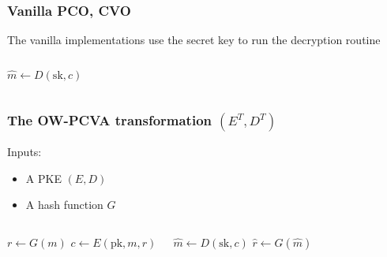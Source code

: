 \documentclass{beamer}
\begin{document}
\begin{frame}
    \frametitle{Vanilla PCO, CVO}

    The vanilla implementations use the secret key to run the decryption routine

    \begin{columns}
        \begin{algorithm}[H]
        \SetAlgoLined
        \caption{$\mathcal{O}^\text{CVO}$}
        $\hat{m} \leftarrow D(\text{sk}, c)$\;
        \;
        \end{algorithm}

        \begin{algorithm}[H]
        \SetAlgoLined
        \caption{$\mathcal{O}^\text{PCO}$}
        \;
    \end{algorithm}
    \end{columns}
\end{frame}

\begin{frame}
    \frametitle{The OW-PCVA transformation $(E^T, D^T)$}

    Inputs:
    \begin{itemize}
        \item A PKE $(E, D)$
        \item A hash function $G$
    \end{itemize}

    \begin{columns}
        \begin{algorithm}[H]
            \SetAlgoLined
            \caption{$E^T$}
            $r \leftarrow G(m)$\;
            $c \leftarrow E(\text{pk}, m, r)$\;
            \;
        \end{algorithm}

        \begin{algorithm}[H]
            \SetAlgoLined
            \caption{$D^T$}
            $\hat{m} \leftarrow D(\text{sk}, c)$\;
            $\hat{r} \leftarrow G(\hat{m})$\;
            \;
        \end{algorithm}
    \end{columns}
\end{frame}
\end{document}
